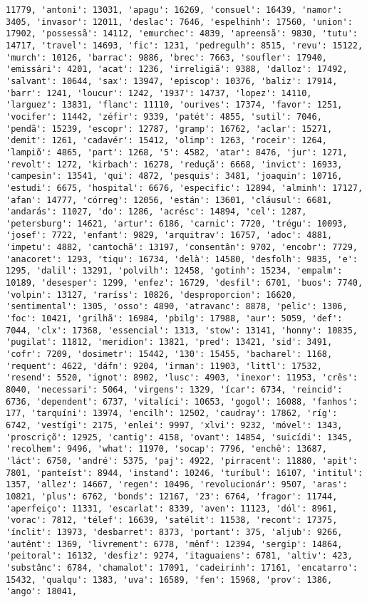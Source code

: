 \documentclass[11pt]{article}
\begin{document}
\begin{Verbatim}[commandchars=\\\{\}]
11779, 'antoni': 13031, 'apagu': 16269, 'consuel': 16439, 'namor': 3405, 'invasor': 12011, 'deslac': 7646, 'espelhinh': 17560, 'union': 17902, 'possessã': 14112, 'emurchec': 4839, 'apreensã': 9830, 'tutu': 14717, 'travel': 14693, 'fic': 1231, 'pedregulh': 8515, 'revu': 15122, 'murch': 10126, 'barrac': 9886, 'brec': 7663, 'soufler': 17940, 'emissári': 4201, 'acat': 1236, 'irreligiã': 9388, 'dalloz': 17492, 'salvant': 10644, 'sax': 13947, 'episcop': 10376, 'baliz': 17914, 'barr': 1241, 'loucur': 1242, '1937': 14737, 'lopez': 14110, 'larguez': 13831, 'flanc': 11110, 'ourives': 17374, 'favor': 1251, 'vocifer': 11442, 'zéfir': 9339, 'patét': 4855, 'sutil': 7046, 'pendã': 15239, 'escopr': 12787, 'gramp': 16762, 'aclar': 15271, 'demit': 1261, 'cadavér': 15412, 'olimp': 1263, 'roceir': 1264, 'lampiõ': 4865, 'part': 1268, '5': 4582, 'atar': 8476, 'jur': 1271, 'revolt': 1272, 'kirbach': 16278, 'reduçã': 6668, 'invict': 16933, 'campesin': 13541, 'qui': 4872, 'pesquis': 3481, 'joaquin': 10716, 'estudi': 6675, 'hospital': 6676, 'especific': 12894, 'alminh': 17127, 'afan': 14777, 'córreg': 12056, 'están': 13601, 'cláusul': 6681, 'andarás': 11027, 'do': 1286, 'acrésc': 14894, 'cel': 1287, 'petersburg': 14621, 'artur': 6186, 'carnic': 7720, 'trégu': 10093, 'josef': 7722, 'enfant': 9829, 'arquitrav': 16757, 'adoc': 4881, 'impetu': 4882, 'cantochã': 13197, 'consentân': 9702, 'encobr': 7729, 'anacoret': 1293, 'tiqu': 16734, 'delà': 14580, 'desfolh': 9835, 'e': 1295, 'dalil': 13291, 'polvilh': 12458, 'gotinh': 15234, 'empalm': 10189, 'desesper': 1299, 'enfez': 16729, 'desfil': 6701, 'buos': 7740, 'volpin': 13127, 'raríss': 10826, 'desproporcion': 16620, 'sentimental': 1305, 'osso': 4890, 'atravanc': 8878, 'pelic': 1306, 'foc': 10421, 'grilhã': 16984, 'pbilg': 17988, 'aur': 5059, 'def': 7044, 'clx': 17368, 'essencial': 1313, 'stow': 13141, 'honny': 10835, 'pugilat': 11812, 'meridion': 13821, 'pred': 13421, 'sid': 3491, 'cofr': 7209, 'dosimetr': 15442, '130': 15455, 'bacharel': 1168, 'requent': 4622, 'dáfn': 9204, 'irman': 11903, 'littl': 17532, 'resend': 5520, 'ignot': 8902, 'lusc': 4903, 'inexor': 11953, 'crês': 8040, 'necessari': 5064, 'virgens': 1329, 'ícar': 6734, 'reincid': 6736, 'dependent': 6737, 'vitalíci': 10653, 'gogol': 16088, 'fanhos': 177, 'tarquíni': 13974, 'encilh': 12502, 'caudray': 17862, 'ríg': 6742, 'vestígi': 2175, 'enlei': 9997, 'xlvi': 9232, 'móvel': 1343, 'proscriçõ': 12925, 'cantig': 4158, 'ovant': 14854, 'suicídi': 1345, 'recolhem': 9496, 'what': 11970, 'socap': 7796, 'enchê': 13687, 'láct': 6750, 'andré': 5375, 'paj': 4922, 'pirracent': 11880, 'apit': 7801, 'panteíst': 8944, 'instand': 10246, 'turíbul': 16107, 'intitul': 1357, 'allez': 14667, 'regen': 10496, 'revolucionár': 9507, 'aras': 10821, 'plus': 6762, 'bonds': 12167, '23': 6764, 'fragor': 11744, 'aperfeiço': 11331, 'escarlat': 8339, 'aven': 11123, 'dól': 8961, 'vorac': 7812, 'télef': 16639, 'satélit': 11538, 'recont': 17375, 'ínclit': 13973, 'desbarret': 8373, 'portant': 375, 'aljub': 9266, 'autênt': 1369, 'livrement': 6778, 'mênf': 12394, 'sergip': 14864, 'peitoral': 16132, 'desfiz': 9274, 'itaguaiens': 6781, 'altiv': 423, 'substânc': 6784, 'chamalot': 17091, 'cadeirinh': 17161, 'encatarro': 15432, 'qualqu': 1383, 'uva': 16589, 'fen': 15968, 'prov': 1386, 'ango': 18041, 
\end{Verbatim}
\end{document}
